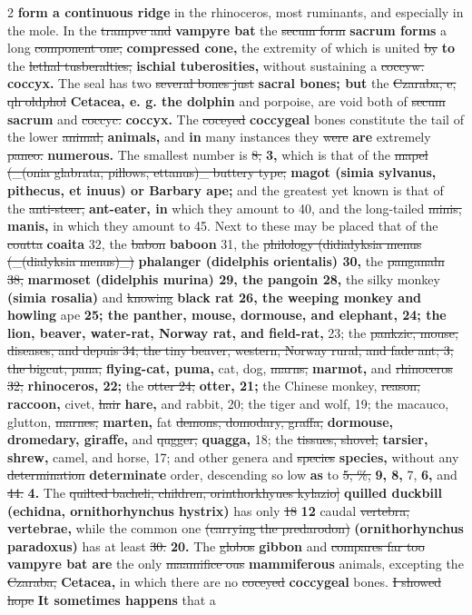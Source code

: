\documentclass[10pt]{article}
\begin{document}
\begin{multicols}{2}
\textbf{form a continuous ridge} in the rhinoceros, most ruminants, and especially in the mole. In the \sout{trampve and} \textbf{vampyre bat} the \sout{secum form} \textbf{sacrum forms} a long \sout{component one,} \textbf{compressed cone,} the extremity of which is united \sout{by} \textbf{to} the \sout{lethal tusberalties,} \textbf{ischial tuberosities,} without sustaining a \sout{coccyw.} \textbf{coccyx.} The seal has two \sout{several bones just} \textbf{sacral bones; but} the \sout{Czaraba, e, qh oldphol} \textbf{Cetacea, e. g. the dolphin} and porpoise, are void both of \sout{secum} \textbf{sacrum} and \sout{coccyc.} \textbf{coccyx.} The \sout{coceyed} \textbf{coccygeal} bones constitute the tail of the lower \sout{animal,} \textbf{animals,} and \textbf{in} many instances they \sout{were} \textbf{are} extremely \sout{paneo.} \textbf{numerous.} The smallest number is \sout{8,} \textbf{3,} which is that of the \sout{mapel (\_(onia glabrata, pillows, ettanus)\_ buttery type;} \textbf{magot (simia sylvanus, pithecus, et inuus) or Barbary ape;} and the greatest yet known is that of the \sout{anti-steer,} \textbf{ant-eater, in} which they amount to 40, and the long-tailed \sout{minis,} \textbf{manis,} in which they amount to 45. Next to these may be placed that of the \sout{coutta} \textbf{coaita} 32, the \sout{babon} \textbf{baboon} 31, the \sout{philology (didialyksia menus (\_(dialyksia menus)\_)} \textbf{phalanger (didelphis orientalis) 30,} the \sout{panganaln 38,} \textbf{marmoset (didelphis murina) 29, the pangoin 28,} the silky monkey \textbf{(simia rosalia)} and \sout{knowing} \textbf{black rat 26, the weeping monkey and howling} ape \textbf{25; the panther, mouse, dormouse, and elephant, 24; the lion, beaver, water-rat, Norway rat, and field-rat,} 23; the \sout{pankzic, mouse, diseases, and depuis 34; the tiny beaver, western, Norway rural, and fade ant; 3; the bigcut, pana,} \textbf{flying-cat, puma,} cat, dog, \sout{marns,} \textbf{marmot,} and \sout{rhinoceros 32;} \textbf{rhinoceros, 22;} the \sout{otter 24;} \textbf{otter, 21;} the Chinese monkey, \sout{reason,} \textbf{raccoon,} civet, \sout{hair} \textbf{hare,} and rabbit, 20; the tiger and wolf, 19; the macauco, glutton, \sout{marnes,} \textbf{marten,} fat \sout{demons, domodary, graffa,} \textbf{dormouse, dromedary, giraffe,} and \sout{qugger,} \textbf{quagga,} 18; the \sout{tissues, shovel,} \textbf{tarsier, shrew,} camel, and horse, 17; and other genera and \sout{species} \textbf{species,} without any \sout{determination} \textbf{determinate} order, descending so low \textbf{as} to \sout{5, \%,} \textbf{9, 8,} 7, \textbf{6,} and \sout{44.} \textbf{4.} The \sout{quilted bacheli, children, orinthorkhyues kylazio]} \textbf{quilled duckbill (echidna, ornithorhynchus hystrix)} has only \sout{18} \textbf{12} caudal \sout{vertebra,} \textbf{vertebrae,} while the common one \sout{(carrying the predarodon)} \textbf{(ornithorhynchus paradoxus)} has at least \sout{30.} \textbf{20.} The \sout{globos} \textbf{gibbon} and \sout{compares far too} \textbf{vampyre bat are} the only \sout{maamifice ous} \textbf{mammiferous} animals, excepting the \sout{Czaraba,} \textbf{Cetacea,} in which there are no \sout{coceyed} \textbf{coccygeal} bones. \sout{I showed hope} \textbf{It sometimes happens} that a 
\end{multicols}
\end{document}
